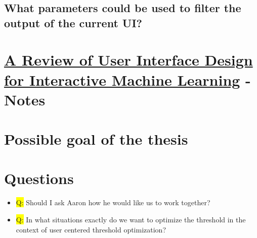 \documentclass[12pt,a4paper]{article}
\begin{document}
\subsection{What parameters could be used to filter the output of the current UI?}

\section{\href{https://doi.org/10.1145/3185517}{A Review of User Interface Design for Interactive Machine Learning} - Notes}

\section{Possible goal of the thesis}

%
%
%
%
%
\section*{Questions}
\begin{itemize}
%
\item \colorbox{yellow}{Q:} Should I ask Aaron how he would like us to work together?
%
\item \colorbox{yellow}{Q:} In what situations exactly do we want to optimize the threshold in the context of user centered threshold optimization?
%
\end{itemize}
\end{document}
